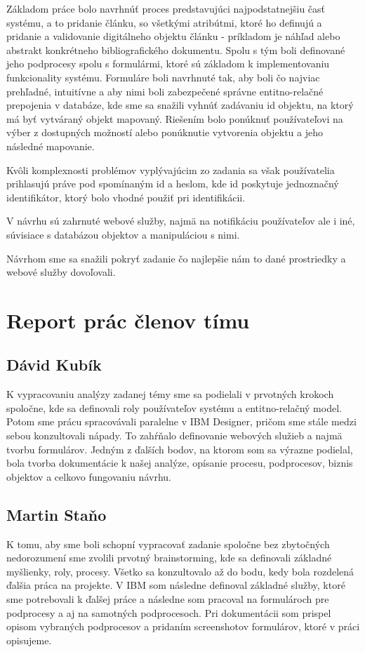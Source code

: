\documentclass[10pt,oneside,slovak,a4paper]{article}
\begin{document}
Základom práce bolo navrhnúť proces predstavujúci najpodstatnejšiu časť systému, a to pridanie článku, so všetkými atribútmi, ktoré ho definujú a pridanie a validovanie digitálneho objektu článku - príkladom je náhľad alebo abstrakt konkrétneho bibliografického dokumentu. Spolu s tým boli definované jeho podprocesy spolu s formulármi, ktoré sú základom k implementovaniu funkcionality systému. Formuláre boli navrhnuté tak, aby boli čo najviac prehľadné, intuitívne a aby nimi boli zabezpečené správne entitno-relačné prepojenia v databáze, kde sme sa snažili vyhnúť zadávaniu id objektu, na ktorý má byť vytváraný objekt mapovaný. Riešením bolo ponúknuť používateľovi na výber z dostupných možností alebo ponúknutie vytvorenia objektu a jeho následné mapovanie.

Kvôli komplexnosti problémov vyplývajúcim zo zadania sa však používatelia prihlasujú práve pod spomínaným id a heslom, kde id poskytuje jednoznačný identifikátor, ktorý bolo vhodné použiť pri identifikácii.

V návrhu sú zahrnuté webové služby, najmä na notifikáciu používateľov ale i iné, súvisiace s databázou objektov a manipuláciou s nimi.

Návrhom sme sa snažili pokryť zadanie čo najlepšie nám to dané prostriedky a webové služby dovoľovali.

\section{Report prác členov tímu}
\subsection{Dávid Kubík}
K vypracovaniu analýzy zadanej témy sme sa podielali v prvotných krokoch spoločne, kde sa definovali roly používateľov systému a entitno-relačný model. Potom sme prácu spracovávali paralelne v IBM Designer, pričom sme stále medzi sebou konzultovali nápady. To zahŕňalo definovanie webových služieb a najmä tvorbu formulárov. Jedným z ďalších bodov, na ktorom som sa výrazne podielal, bola tvorba dokumentácie k našej analýze, opísanie procesu, podprocesov, biznis objektov a celkovo fungovaniu návrhu.
\subsection{Martin Staňo}
K tomu, aby sme boli schopní vypracovať zadanie spoločne bez zbytočných nedorozumení sme zvolili prvotný brainstorming, kde sa definovali základné myšlienky, roly, procesy. Všetko sa konzultovalo až do bodu, kedy bola rozdelená ďalšia práca na projekte. V IBM som následne definoval základné služby, ktoré sme potrebovali k ďalšej práce a následne som pracoval na formulároch pre podprocesy a aj na samotných podprocesoch. Pri dokumentácii som prispel opisom vybraných podprocesov a pridaním screenshotov formulárov, ktoré v práci opisujeme.
\end{document}
